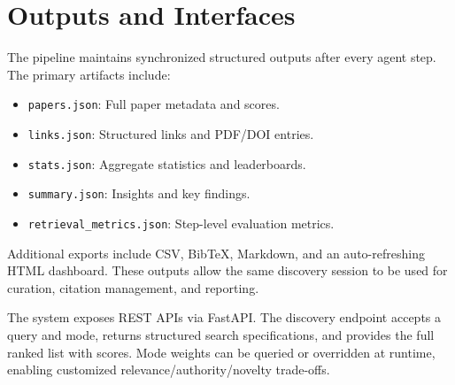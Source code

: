 \section{Outputs and Interfaces}
The pipeline maintains synchronized structured outputs after every agent step. The primary artifacts include:
\begin{itemize}
  \item \texttt{papers.json}: Full paper metadata and scores.
  \item \texttt{links.json}: Structured links and PDF/DOI entries.
  \item \texttt{stats.json}: Aggregate statistics and leaderboards.
  \item \texttt{summary.json}: Insights and key findings.
  \item \texttt{retrieval\_metrics.json}: Step-level evaluation metrics.
\end{itemize}
Additional exports include CSV, BibTeX, Markdown, and an auto-refreshing HTML dashboard. These outputs allow the same discovery session to be used for curation, citation management, and reporting.

The system exposes REST APIs via FastAPI. The discovery endpoint accepts a query and mode, returns structured search specifications, and provides the full ranked list with scores. Mode weights can be queried or overridden at runtime, enabling customized relevance/authority/novelty trade-offs.
